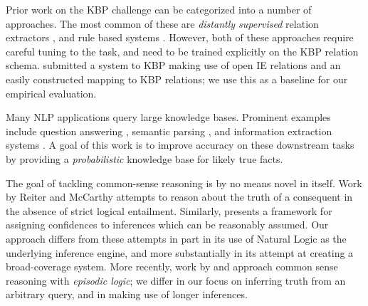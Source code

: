 %
%
%


Prior work on the KBP challenge can be categorized into a number of approaches.
The most common of these are \textit{distantly supervised} relation extractors
  \cite{key:1999craven-distsup,key:2007wu-distsup,key:2009mintz-distsup,key:2011sun-kbp},
  and rule based systems
  \cite{key:1997soderland-kbp,key:2010grishman-kbp,key:2010chen-kbp}.
However, both of these approaches require careful tuning to the task, and
  need to be trained explicitly on the KBP relation schema.
 submitted a system to KBP making use of
  open IE relations and an easily constructed mapping to KBP relations;
  we use this as a baseline for our empirical evaluation.

Many NLP applications query large knowledge bases.
Prominent examples include
  question answering
    \cite{key:2001voorhees-trec},
  semantic parsing
    \cite{key:1996zelle-semantics,key:2007zettlemoyer-semantics,key:2013kwiatkowski-semantics,key:2014berant-semantics},
  and information extraction systems
    \cite{key:2011hoffman-kbp,key:2012surdeanu-mimlre}.
A goal of this work is to improve accuracy on these
  downstream tasks by providing a \textit{probabilistic} knowledge base
  for
  likely true facts.


%
%
%

The goal of tackling common-sense reasoning is by no means novel in
  itself.
Work by Reiter and McCarthy \cite{key:1980reiter-logic,key:1980mccarthy-circumscription}
  attempts to reason about the truth of a consequent
  in the absence of strict logical entailment.
Similarly,  presents a framework for
  assigning confidences to inferences which can be reasonably assumed.
Our approach differs from these attempts in part in its use of Natural Logic
  as the underlying inference engine, and more substantially in its
  attempt at creating a broad-coverage system.
More recently, work by  and
   approach common sense reasoning
  with \textit{episodic logic}; we differ in our focus on inferring
  truth from an arbitrary query, and in making use of longer inferences.



%
%
%

